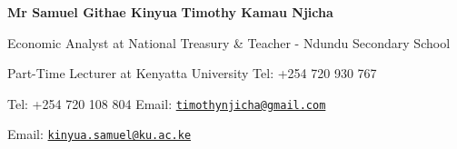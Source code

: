 \documentclass[11pt,]{article}
\begin{document}
\textbf{Mr Samuel Githae Kinyua}  \textbf{Timothy
Kamau Njicha}

Economic Analyst at National Treasury \&  Teacher -
Ndundu Secondary School

Part-Time Lecturer at Kenyatta University  Tel: +254
720 930 767

Tel: +254 720 108 804  Email:
\href{mailto:timothynjicha@gmail.com}{\nolinkurl{timothynjicha@gmail.com}}

Email:
\href{mailto:kinyua.samuel@ku.ac.ke}{\nolinkurl{kinyua.samuel@ku.ac.ke}}
\end{document}
